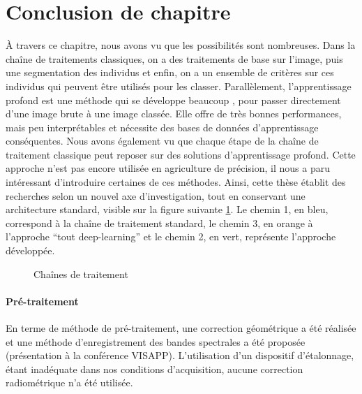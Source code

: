 \documentclass[../thesis.tex]{subfiles}
\begin{document}
    \newpage
    \section{Conclusion de chapitre}
    
    À travers ce chapitre, nous avons vu que les possibilités sont nombreuses. Dans la chaîne de traitements classiques, on a des traitements de base sur l'image, puis une segmentation des individus et enfin, on a un ensemble de critères sur ces individus qui peuvent être utilisés pour les classer.
    Parallèlement, l'apprentissage profond est une méthode qui se développe beaucoup \cite{kamilaris2018deep}, pour passer directement d'une image brute à une image classée. Elle offre de très bonnes performances, mais peu interprétables et nécessite des bases de données d'apprentissage conséquentes. Nous avons également vu que chaque étape de la chaîne de traitement classique peut reposer sur des solutions d'apprentissage profond. Cette approche n'est pas encore utilisée en agriculture de précision, il nous a paru intéressant d'introduire certaines de ces méthodes. Ainsi, cette thèse établit des recherches selon un nouvel axe d'investigation, tout en conservant une architecture standard, visible sur la figure suivante \ref{fig:03-current-proposed-standar}. Le chemin 1, en bleu, correspond à la chaîne de traitement standard, le chemin 3, en orange à l'approche ``tout deep-learning'' et le chemin 2, en vert, représente l'approche développée.
    
    \begin{figure}[H]
        \vspace{-1em}
        
        \centering
        \caption{Chaînes de traitement}
        \label{fig:03-current-proposed-standar}
    \end{figure}
    
    \paragraph{Pré-traitement} En terme de méthode de pré-traitement, une correction géométrique a été réalisée et une méthode d'enregistrement des bandes spectrales a été proposée (présentation à la conférence VISAPP). L'utilisation d'un dispositif d'étalonnage, étant inadéquate dans nos conditions d'acquisition, aucune correction radiométrique n'a été utilisée.
    
\end{document}

